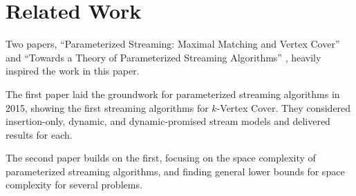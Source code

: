 \section{Related Work}

Two papers, ``Parameterized Streaming: Maximal Matching and Vertex Cover''
\cite{chitnis2015parameterized} and ``Towards a Theory of Parameterized
Streaming Algorithms'' \cite{chitnis2019towards}, heavily inspired the work in
this paper.

The first paper laid the groundwork for parameterized streaming
algorithms in 2015, showing the first streaming algorithms for \(k\)-Vertex
Cover. They considered insertion-only, dynamic, and dynamic-promised stream
models and delivered results for each.

The second paper builds on the first, focusing on the space complexity of
parameterized streaming algorithms, and finding general lower bounds for space
complexity for several problems.